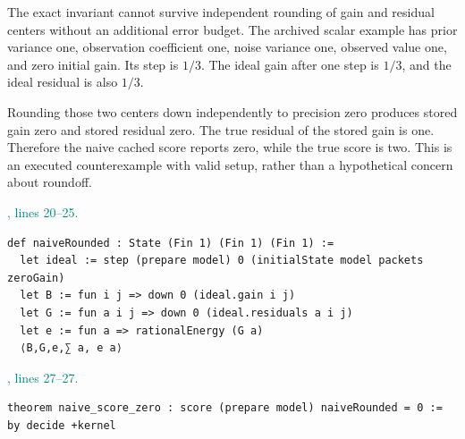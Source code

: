 \documentclass[11pt]{article}\usepackage{needspace}\renewcommand{\paperkind}{Lean companion}\setlength{\parskip}{0.35em}
\begin{document}
The exact invariant cannot survive independent rounding of gain and residual centers without an additional error budget. The archived scalar example has prior variance one, observation coefficient one, noise variance one, observed value one, and zero initial gain. Its step is $1/3$. The ideal gain after one step is $1/3$, and the ideal residual is also $1/3$.

Rounding those two centers down independently to precision zero produces stored gain zero and stored residual zero. The true residual of the stored gain is one. Therefore the naive cached score reports zero, while the true score is two. This is an executed counterexample with valid setup, rather than a hypothetical concern about roundoff.



{\small\textcolor{teal}{, lines 20--25.}\par}

\begin{lstlisting}[style=BayesSource]
def naiveRounded : State (Fin 1) (Fin 1) (Fin 1) :=
  let ideal := step (prepare model) 0 (initialState model packets zeroGain)
  let B := fun i j => down 0 (ideal.gain i j)
  let G := fun a i j => down 0 (ideal.residuals a i j)
  let e := fun a => rationalEnergy (G a)
  ⟨B,G,e,∑ a, e a⟩
\end{lstlisting}



{\small\textcolor{teal}{, lines 27--27.}\par}

\begin{lstlisting}[style=BayesSource]
theorem naive_score_zero : score (prepare model) naiveRounded = 0 := by decide +kernel
\end{lstlisting}


\end{document}
